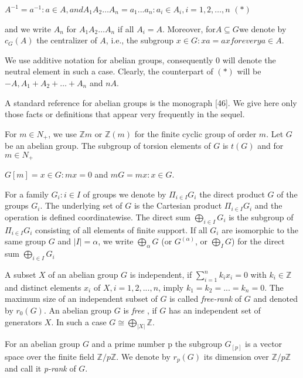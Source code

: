 \documentclass[12pt]{article}
\begin{document}
$A^{-1} = {a^{-1} : a \in A}, and A_1 A_2 \dotsc A_n = {a_1 . . . a_n : a_i \in A_i, i = 1, 2, \dotsc , n}$    $ (*) $


and we write $A_n$ for $A_1 A_2 \dotsc A_n$ if all $A_i = A$. Moreover, for$ A \subseteq G $we denote by $c_{G}(A)$ the centralizer of $A$,
i.e., the subgroup ${x \in G : xa = ax for every a \in A}$.


    We use additive notation for abelian groups, consequently 0 will denote the neutral element in such a case.
Clearly, the counterpart of $(*)$ will be $-A, A_1 + A_2 + \dotsc + A_n$ and $nA$.


    A standard reference for abelian groups is the monograph [46]. We give here only those facts or definitions
that appear very frequently in the sequel.


    For $m \in N_+$, we use $\mathbb{Z}m$ or $\mathbb{Z}(m)$ for the finite cyclic group of order $m$. Let $G$ be an abelian group. The
subgroup of torsion elements of $G$ is $t(G)$ and for $m \in N_+$


$G[m] = {x \in G : mx = 0}$ and $mG = {mx : x \in G}$.


    For a family $ {G_i : i \in I} $ of groups we denote by $ \Pi_{i \in I} G_i $ the direct product $ G $ of the groups $ G_i $. The underlying
set of $ G $ is the Cartesian product $ \Pi_{i \in I} G_i $ and the operation is defined coordinatewise. The direct sum $ \bigoplus_{i \in I} G_i $
is the subgroup of $\Pi_{i \in I} G_i$ consisting of all elements of finite support. If all $ G_i $ are isomorphic to the same
group $ G $ and $ |I| = \alpha $, we write $ \bigoplus_{\alpha} G $ (or $ G^{(\alpha)} $, or $ \bigoplus_I G $) for the direct sum $ \bigoplus_{i \in I} G_i $


    A subset $X$ of an abelian group $G$ is independent, if $ \sum_{i=1}^{n} k_i x_i = 0 $ with $ k_i \in \mathbb{Z} $ and distinct elements $ x_i $ of
$ X, i = 1, 2, . . . , n $, imply $ k_1 = k_2 = . . . = k_n = 0 $. The maximum size of an independent subset of $ G $ is called
\emph{free-rank} of $ G $ and denoted by $r_{0} (G) $. An abelian group $G$ is \emph{free} , if $ G $ has an independent set of generators $ X $.
In such a case $ G \cong \bigoplus_{|X|} \mathbb{Z} $.


    For an abelian group $ G $ and a prime number p the subgroup $ G_[p] $ is a vector space over the finite field $ \mathbb{Z} /p \mathbb{Z} $.
We denote by $r_{p} (G)$ its dimension over $ \mathbb{Z} /p \mathbb{Z} $ and call it \emph{p-rank} of $G$.
\end{document}
